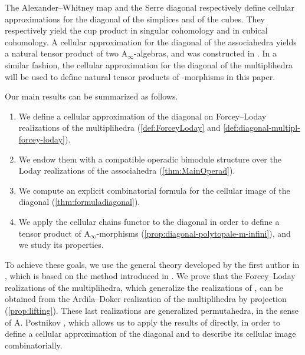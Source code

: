 \documentclass[twoside, 11pt]{amsart}
\theoremstyle{remark}
\begin{document}
\medskip

The Alexander--Whitney map \cite{EilenbergMacLane53} and the Serre diagonal \cite{Serre51} respectively define cellular approximations for the diagonal of the simplices and of the cubes. 
They respectively yield the cup product in singular cohomology and in cubical cohomology.
A cellular approximation for the diagonal of the associahedra yields a natural tensor product of two $\mathrm{A}_\infty$-algebras, and was constructed in \cite{SaneblidzeUmble04,MarklShnider06,MTTV19}. 
In a similar fashion, the cellular approximation for the diagonal of the multiplihedra will be used to define natural tensor products of \Ainf -morphisms in this paper.

\medskip

Our main results can be summarized as follows.
\begin{enumerate}
  \item We define a cellular approximation of the diagonal on Forcey--Loday realizations of the multiplihedra (\cref{def:ForceyLoday} and \cref{def:diagonal-multipl-forcey-loday}).
  \item We endow them with a compatible operadic bimodule structure over the Loday realizations of the associahedra (\cref{thm:MainOperad}).
  \item We compute an explicit combinatorial formula for the cellular image of the diagonal (\cref{thm:formuladiagonal}).
  \item We apply the cellular chains functor to the diagonal in order to define a tensor product of $\mathrm{A}_\infty$-morphisms (\cref{prop:diagonal-polytopale-m-infini}), and we study its properties.
\end{enumerate}


To achieve these goals, we use the general theory developed by the first author in \cite{LA21}, which is based on the method introduced in \cite{MTTV19}.
We prove that the Forcey--Loday realizations of the multiplihedra, which generalize the realizations of \cite{Forcey08}, can be obtained from the Ardila--Doker realization of the multiplihedra \cite{AD13} by projection (\cref{prop:lifting}).
These last realizations are generalized permutahedra, in the sense of A. Postnikov \cite{Postnikov09}, which allows us to apply the results of \cite{LA21} directly, in order to define a cellular approximation of the diagonal and to describe its cellular image combinatorially.

\medskip
\end{document}
